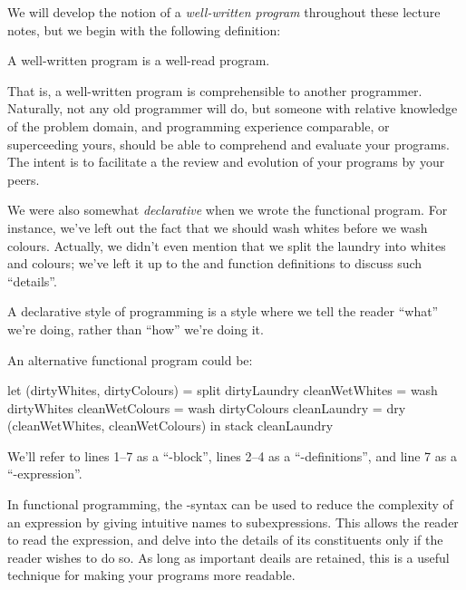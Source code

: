 We will develop the notion of a \emph{well-written program} throughout these
lecture notes, but we begin with the following definition:

\begin{definition}

A well-written program is a well-read program.

\end{definition}

That is, a well-written program is comprehensible to another programmer.
Naturally, not any old programmer will do, but someone with relative knowledge
of the problem domain, and programming experience comparable, or superceeding
yours, should be able to comprehend and evaluate your programs. The intent is
to facilitate a the review and evolution of your programs by your peers.

We were also somewhat \emph{declarative} when we wrote the functional program.
For instance, we've left out the fact that we should wash whites before we wash
colours. Actually, we didn't even mention that we split the laundry into whites
and colours; we've left it up to the  and  function
definitions to discuss such ``details''.

\begin{definition}

A declarative style of programming is a style where we tell the reader ``what''
we're doing, rather than ``how'' we're doing it.

\end{definition}

An alternative functional program could be:

\begin{code}
let
  (dirtyWhites, dirtyColours) = split dirtyLaundry
  cleanWetWhites = wash dirtyWhites
  cleanWetColours = wash dirtyColours
  cleanLaundry = dry (cleanWetWhites, cleanWetColours)
in
  stack cleanLaundry
\end{code}

We'll refer to lines 1--7 as a ``-block'', lines 2--4 as a
``-definitions'', and line 7 as a ``-expression''.

In functional programming, the -syntax can be used to reduce the
complexity of an expression by giving intuitive names to subexpressions. This
allows the reader to read the expression, and delve into the details of its
constituents only if the reader wishes to do so. As long as important deails
are retained, this is a useful technique for making your programs more
readable.

